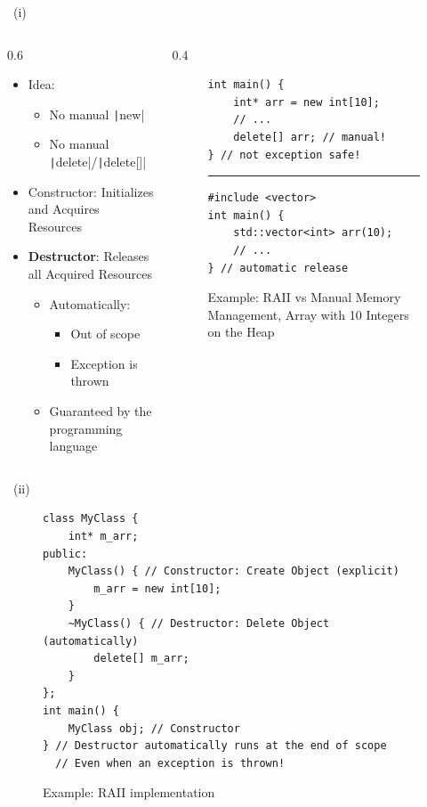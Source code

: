 \begin{frame}[fragile]{\patternname\ (i)}
	\begin{columns}[T,onlytextwidth]
		\begin{column}{0.6\textwidth}
			\begin{itemize}
				\item Idea:
				      \begin{itemize}
					      \item No manual \texttt|new|
					      \item No manual \texttt|delete|/\texttt|delete[]|
				      \end{itemize}
				\item Constructor: Initializes and Acquires Resources
				\item \textbf{Destructor}: Releases all Acquired Resources
				      \begin{itemize}
					      \item Automatically:
					            \begin{itemize}
						            \item Out of scope
						            \item Exception is thrown
					            \end{itemize}
					      \item Guaranteed by the programming language
				      \end{itemize}
			\end{itemize}
		\end{column}
		\begin{column}{0.4\textwidth}
			\begin{figure}
				\centering
				\begin{verbatim}
int main() {
    int* arr = new int[10];
    // ...
    delete[] arr; // manual!
} // not exception safe!
                \end{verbatim}
				\rule{\linewidth}{0.5mm}
				\begin{verbatim}
#include <vector>
int main() {
    std::vector<int> arr(10);
    // ...
} // automatic release
                \end{verbatim}
				\caption{Example: RAII vs Manual Memory Management, Array with 10 Integers on the Heap}
			\end{figure}
		\end{column}
	\end{columns}
\end{frame}

\begin{frame}[fragile]{\patternname\ (ii)}
	\begin{figure}
		\centering
		\begin{verbatim}
class MyClass {
	int* m_arr;
public:
	MyClass() { // Constructor: Create Object (explicit)
		m_arr = new int[10];
	}
	~MyClass() { // Destructor: Delete Object (automatically)
		delete[] m_arr;
	}
};
int main() {
	MyClass obj; // Constructor
} // Destructor automatically runs at the end of scope
  // Even when an exception is thrown!
	    \end{verbatim}
		\caption{Example: RAII implementation}
	\end{figure}
\end{frame}


